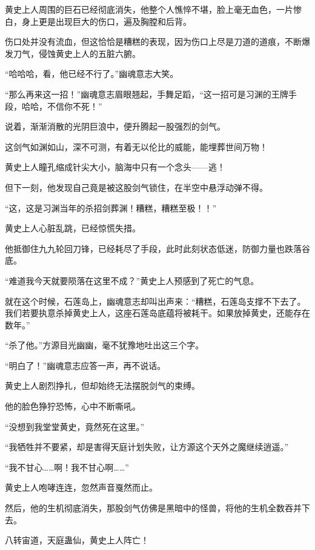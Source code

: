 \begin{this_body}
黄史上人周围的巨石已经彻底消失，他整个人憔悴不堪，脸上毫无血色，一片惨白，身上更是出现巨大的伤口，遍及胸膛和后背。

伤口处并没有流血，但这恰恰是糟糕的表现，因为伤口上尽是刀道的道痕，不断爆发刀气，侵蚀黄史上人的五脏六腑。

“哈哈哈，看，他已经不行了。”幽魂意志大笑。

“那么再来这一招！”幽魂意志眉眼翘起，手舞足蹈，“这一招可是习渊的王牌手段，哈哈，不信你不死！”

说着，渐渐消散的光阴巨浪中，便升腾起一股强烈的剑气。

这剑气如渊如山，深不可测，有着无以伦比的威能，能埋葬世间万物！

黄史上人瞳孔缩成针尖大小，脑海中只有一个念头——逃！

但下一刻，他发现自己竟是被这股剑气锁住，在半空中悬浮动弹不得。

“这，这是习渊当年的杀招剑葬渊！糟糕，糟糕至极！！”

黄史上人心脏乱跳，已经惊慌失措。

他抵御住九九轮回刀锋，已经耗尽了手段，此时此刻状态低迷，防御力量也跌落谷底。

“难道我今天就要陨落在这里不成？”黄史上人预感到了死亡的气息。

就在这个时候，石莲岛上，幽魂意志却叫出声来：“糟糕，石莲岛支撑不下去了。我们若要执意杀掉黄史上人，这座石莲岛底蕴将被耗干。如果放掉黄史，还能存在数年。”

“杀了他。”方源目光幽幽，毫不犹豫地吐出这三个字。

“明白了！”幽魂意志应答一声，再不说话。

黄史上人剧烈挣扎，但却始终无法摆脱剑气的束缚。

他的脸色狰狞恐怖，心中不断嘶吼。

“没想到我堂堂黄史，竟然死在这里。”

“我牺牲并不要紧，却是害得天庭计划失败，让方源这个天外之魔继续逍遥。”

“我不甘心……啊！我不甘心啊……”

黄史上人咆哮连连，忽然声音戛然而止。

然后，他的生机彻底消失，那股剑气仿佛是黑暗中的怪兽，将他的生机全数吞并下去。

八转宙道，天庭蛊仙，黄史上人阵亡！

\end{this_body}

